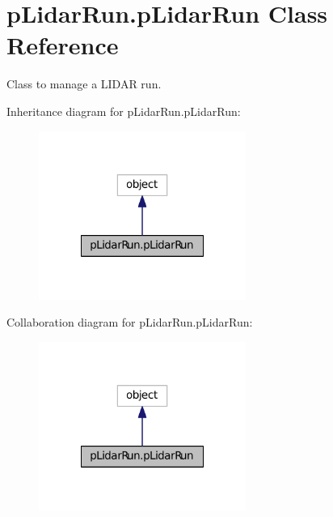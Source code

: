 \hypertarget{classpLidarRun_1_1pLidarRun}{\section{p\-Lidar\-Run.\-p\-Lidar\-Run Class Reference}
\label{classpLidarRun_1_1pLidarRun}
}


Class to manage a L\-I\-D\-A\-R run.  




Inheritance diagram for p\-Lidar\-Run.\-p\-Lidar\-Run\-:\nopagebreak
\begin{figure}[H]
\begin{center}
\leavevmode
\includegraphics[width=192pt]{classpLidarRun_1_1pLidarRun__inherit__graph}
\end{center}
\end{figure}


Collaboration diagram for p\-Lidar\-Run.\-p\-Lidar\-Run\-:\nopagebreak
\begin{figure}[H]
\begin{center}
\leavevmode
\includegraphics[width=192pt]{classpLidarRun_1_1pLidarRun__coll__graph}
\end{center}
\end{figure}
